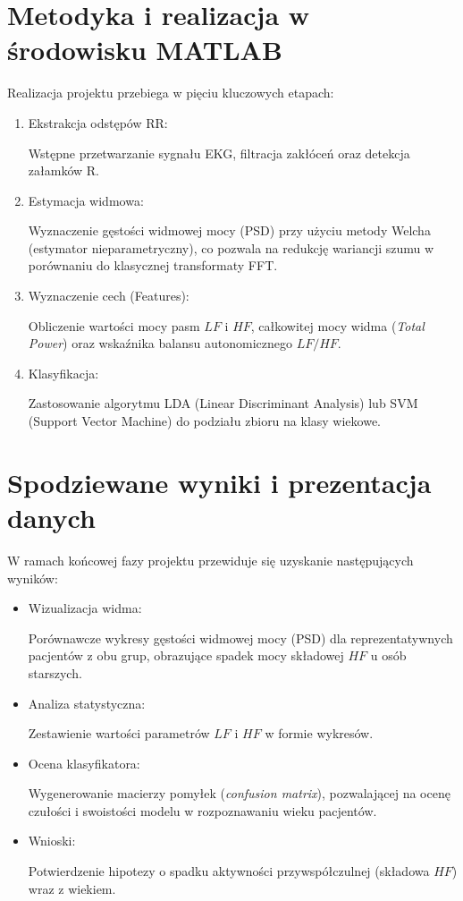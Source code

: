 \documentclass[a4paper,12pt]{article}
\begin{document}
\section{Metodyka i realizacja w środowisku MATLAB}
Realizacja projektu przebiega w pięciu kluczowych etapach:
\begin{enumerate}
    \item Ekstrakcja odstępów RR:
    
    Wstępne przetwarzanie sygnału EKG, filtracja zakłóceń oraz detekcja załamków R.
    \item Estymacja widmowa: 
    
    Wyznaczenie gęstości widmowej mocy (PSD) przy użyciu metody Welcha (estymator nieparametryczny), co pozwala na redukcję wariancji szumu w porównaniu do klasycznej transformaty FFT.
    \item Wyznaczenie cech (Features): 
    
    Obliczenie wartości mocy pasm $LF$ i $HF$, całkowitej mocy widma (\textit{Total Power}) oraz wskaźnika balansu autonomicznego $LF/HF$.
    \item Klasyfikacja: 
    
    Zastosowanie algorytmu LDA (Linear Discriminant Analysis) lub SVM (Support Vector Machine) do podziału zbioru na klasy wiekowe.
\end{enumerate}

\section{Spodziewane wyniki i prezentacja danych}
W ramach końcowej fazy projektu przewiduje się uzyskanie następujących wyników:
\begin{itemize}
    \item Wizualizacja widma:
    
    Porównawcze wykresy gęstości widmowej mocy (PSD) dla reprezentatywnych pacjentów z obu grup, obrazujące spadek mocy składowej $HF$ u osób starszych.
    \item Analiza statystyczna:
    
    Zestawienie wartości parametrów $LF$ i $HF$ w formie wykresów.
    \item Ocena klasyfikatora:
    
    Wygenerowanie macierzy pomyłek (\textit{confusion matrix}), pozwalającej na ocenę czułości i swoistości modelu w rozpoznawaniu wieku pacjentów.
    \item Wnioski:
    
    Potwierdzenie hipotezy o spadku aktywności przywspółczulnej (składowa $HF$) wraz z wiekiem.
\end{itemize}
\end{document}
